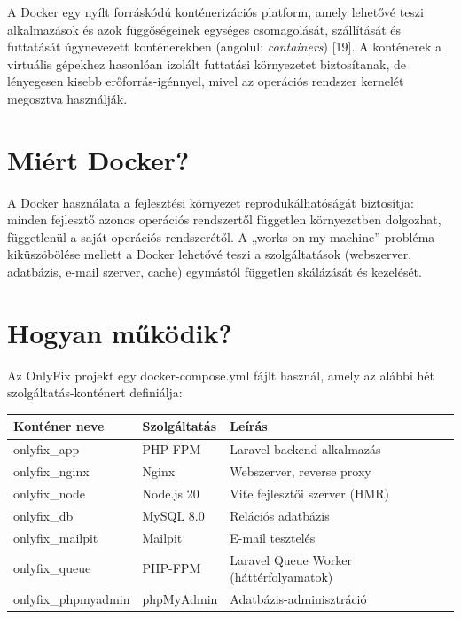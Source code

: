 A Docker egy nyílt forráskódú konténerizációs platform, amely lehetővé teszi alkalmazások és azok függőségeinek egységes csomagolását, szállítását és futtatását úgynevezett konténerekben (angolul: \emph{containers}) {[}19{]}. A konténerek a virtuális gépekhez hasonlóan izolált futtatási környezetet biztosítanak, de lényegesen kisebb erőforrás-igénnyel, mivel az operációs rendszer kernelét megosztva használják.

\section{Miért Docker?}\label{miuxe9rt-docker}

A Docker használata a fejlesztési környezet reprodukálhatóságát biztosítja: minden fejlesztő azonos operációs rendszertől független környezetben dolgozhat, függetlenül a saját operációs rendszerétől. A „works on my machine'' probléma kiküszöbölése mellett a Docker lehetővé teszi a szolgáltatások (webszerver, adatbázis, e-mail szerver, cache) egymástól független skálázását és kezelését.

\section{Hogyan működik?}\label{hogyan-mux171kuxf6dik-5}

Az OnlyFix projekt egy docker-compose.yml fájlt használ, amely az alábbi hét szolgáltatás-konténert definiálja:

{\def\LTcaptype{} %
\begin{longtable}[]{@{}
  >{\raggedright\arraybackslash}p{}
  >{\raggedright\arraybackslash}p{}
  >{\raggedright\arraybackslash}p{}@{}}
\toprule\noalign{}
\begin{minipage}[b]{\linewidth}\raggedright
Konténer neve
\end{minipage} & \begin{minipage}[b]{\linewidth}\raggedright
Szolgáltatás
\end{minipage} & \begin{minipage}[b]{\linewidth}\raggedright
Leírás
\end{minipage} \\
\midrule\noalign{}
\endhead
\bottomrule\noalign{}
\endlastfoot
onlyfix\_app & PHP-FPM & Laravel backend alkalmazás \\
onlyfix\_nginx & Nginx & Webszerver, reverse proxy \\
onlyfix\_node & Node.js 20 & Vite fejlesztői szerver (HMR) \\
onlyfix\_db & MySQL 8.0 & Relációs adatbázis \\
onlyfix\_mailpit & Mailpit & E-mail tesztelés \\
onlyfix\_queue & PHP-FPM & Laravel Queue Worker (háttérfolyamatok) \\
onlyfix\_phpmyadmin & phpMyAdmin & Adatbázis-adminisztráció \\
\end{longtable}
}

